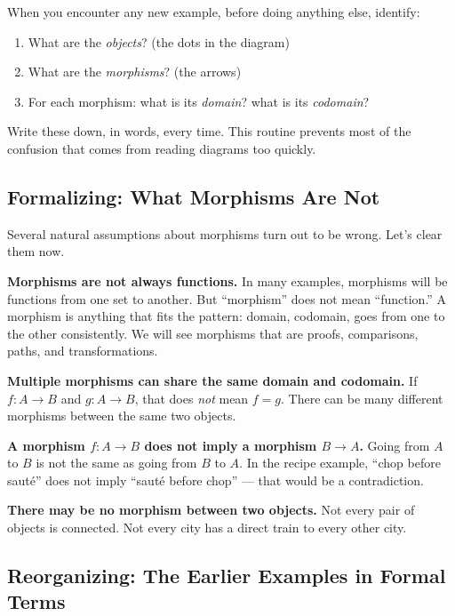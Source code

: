 \begin{readernote}
When you encounter any new example, before doing anything else, identify:
\begin{enumerate}
  \item What are the \emph{objects}? (the dots in the diagram)
  \item What are the \emph{morphisms}? (the arrows)
  \item For each morphism: what is its \emph{domain}? what is its
        \emph{codomain}?
\end{enumerate}
Write these down, in words, every time. This routine prevents most of the
confusion that comes from reading diagrams too quickly.
\end{readernote}

\subsection{Formalizing: What Morphisms Are Not}

Several natural assumptions about morphisms turn out to be wrong. Let's clear
them now.

\textbf{Morphisms are not always functions.}
In many examples, morphisms will be functions from one set to another. But
``morphism'' does not mean ``function.'' A morphism is anything that fits the
pattern: domain, codomain, goes from one to the other consistently. We will
see morphisms that are proofs, comparisons, paths, and transformations.

\textbf{Multiple morphisms can share the same domain and codomain.}
If $f : A \to B$ and $g : A \to B$, that does \emph{not} mean $f = g$.
There can be many different morphisms between the same two objects.

\textbf{A morphism $f : A \to B$ does not imply a morphism $B \to A$.}
Going from $A$ to $B$ is not the same as going from $B$ to $A$. In the recipe
example, ``chop before sauté'' does not imply ``sauté before chop'' --- that
would be a contradiction.

\textbf{There may be no morphism between two objects.}
Not every pair of objects is connected. Not every city has a direct train to
every other city.

\subsection{Reorganizing: The Earlier Examples in Formal Terms}

